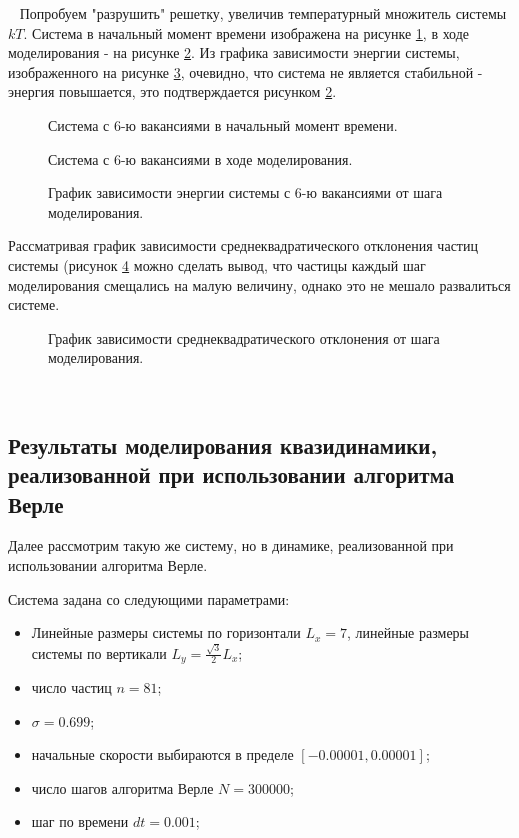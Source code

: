 \documentclass[14pt,a4paper,report]{ncc}
\begin{document}
\
\newpage
Попробуем "разрушить" решетку, увеличив температурный множитель системы $kT$. Система в начальный момент времени изображена на рисунке \ref{ris:image6}, в ходе моделирования - на рисунке \ref{ris:image7}. Из графика зависимости энергии системы, изображенного на рисунке \ref{ris:image8}, очевидно, что система не является стабильной - энергия повышается, это подтверждается рисунком \ref{ris:image7}.
\begin{figure}[h]
\caption{Система с 6-ю вакансиями в начальный момент времени.}
\label{ris:image6}
\end{figure}
\begin{figure}[h!]
\caption{Система с 6-ю вакансиями в ходе моделирования.}
\label{ris:image7}
\end{figure}
\begin{figure}[h!]
\caption{График зависимости энергии системы с 6-ю вакансиями от шага моделирования.}
\label{ris:image8}
\end{figure}
Рассматривая график зависимости среднеквадратического отклонения частиц системы (рисунок \ref{ris:image9} можно сделать вывод, что частицы каждый шаг моделирования смещались на малую величину, однако это не мешало развалиться системе. 
\begin{figure}[h!]
\caption{График зависимости среднеквадратического отклонения от шага моделирования.}
\label{ris:image9}
\end{figure}
\


\newpage
\subsection{Результаты моделирования квазидинамики, реализованной при использовании алгоритма Верле}
Далее рассмотрим такую же систему, но в динамике, реализованной при использовании алгоритма Верле.
\

Система задана со следующими параметрами:
\begin{itemize}
\item Линейные размеры системы по горизонтали $L_x=7$, линейные размеры системы по вертикали $L_y=\frac{\sqrt{3}}{2}L_x$;
\item число частиц $n=81$;
\item $\sigma=0.699$;
\item начальные скорости выбираются в пределе $ [-0.00001,0.00001]$;
\item число шагов алгоритма Верле  $N=300000$;
\item шаг по времени $dt=0.001$;
\end{itemize}
\end{document}
